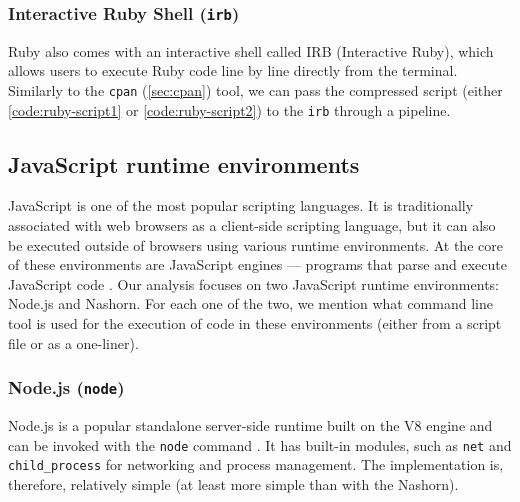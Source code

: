 

\subsubsection{Interactive Ruby Shell (\texttt{irb})}


Ruby also comes with an interactive shell called IRB (Interactive Ruby), which allows users to execute Ruby code line by line directly from the terminal. Similarly to the \texttt{cpan} (\cref{sec:cpan}) tool, we can pass the compressed script (either \cref{code:ruby-script1} or \cref{code:ruby-script2}) to the \texttt{irb} through a pipeline.



\subsection{JavaScript runtime environments}

JavaScript is one of the most popular scripting languages. It is traditionally associated with web browsers as a client-side scripting language, but it can also be executed outside of browsers using various runtime environments. At the core of these environments are JavaScript engines --- programs that parse and execute JavaScript code \cite{js-engines-wiki}. Our analysis focuses on two JavaScript runtime environments: Node.js and Nashorn. For each one of the two, we mention what command line tool is used for the execution of code in these environments (either from a script file or as a one-liner).

\subsubsection{Node.js (\texttt{node})}


Node.js is a popular standalone server-side runtime built on the V8 engine and can be invoked with the \texttt{node} command \cite{nodejs-doc}. It has built-in modules, such as \texttt{net} and \texttt{child\_process} for networking and process management. The implementation is, therefore, relatively simple (at least more simple than with the Nashorn).


